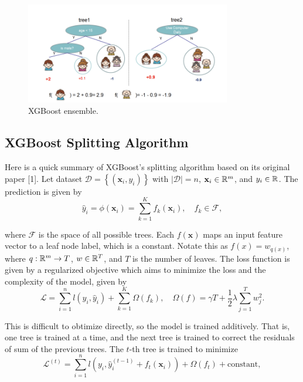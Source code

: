 \documentclass{article}
\begin{document}
\begin{figure}
  \centering
  \includegraphics[width=0.8\textwidth]{xgboost_ensemble.png}
  \caption{XGBoost ensemble.}
  \label{xgboost-ensemble}
\end{figure}

\subsection{XGBoost Splitting Algorithm}

Here is a quick summary of XGBoost's splitting algorithm based on its original paper [1].
Let dataset $\mathcal{D} = \left\{ (\mathbf{x}_i, y_i) \right\}$ with $|\mathcal{D}| = n$, $\mathbf{x}_i \in \mathbb{R}^m$, and $y_i \in \mathbb{R}$.
The prediction is given by 
\begin{equation*}
  \hat{y}_i = \phi(\mathbf{x}_i) = \sum_{k=1}^K f_k(\mathbf{x}_i), \quad f_k \in \mathcal{F},
\end{equation*}

where $\mathcal{F}$ is the space of all possible trees. Each $f(\mathbf{x})$ maps an input feature vector to a leaf node label, which is a constant.
Notate this as $f(x) = w_{q(x)}$, where $q: \mathbb{R}^m \to T$, $w \in \mathbb{R}^T$, and $T$ is the number of leaves.
The loss function is given by a regularized objective which aims to minimize the loss and the complexity of the model, given by
\begin{equation*}
  \mathcal{L} = \sum_{i=1}^n l(y_i, \hat{y}_i) + \sum_{k=1}^K \Omega(f_k), \quad \Omega(f) = \gamma T + \frac{1}{2} \lambda \sum_{j=1}^T w_j^2.
\end{equation*}

This is difficult to obtimize directly, so the model is trained additively. That is, one tree is trained at a time, and the next tree is trained to correct the residuals of sum of the previous trees.
The $t$-th tree is trained to minimize
\begin{equation*}
  \mathcal{L}^{(t)} = \sum_{i=1}^n l(y_i, \hat{y}_i^{(t-1)} + f_t(\mathbf{x}_i)) + \Omega(f_t) + \text{constant},
\end{equation*}
\end{document}
